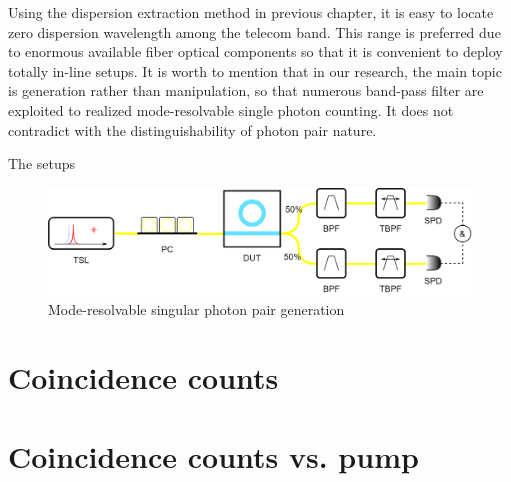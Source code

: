Using the dispersion extraction method in previous chapter, it is easy to locate zero dispersion wavelength among the telecom band. This range is preferred due to enormous available fiber optical components so that it is convenient to deploy totally in-line setups.
It is worth to mention that in our research, the main topic is generation rather than manipulation, so that numerous band-pass filter are exploited to realized mode-resolvable single photon counting. It does not contradict with the distinguishability of photon pair nature.

The setups 

\begin{figure}
	\centering
	\includegraphics[width=0.7\linewidth]{imgs/png/biBPF}
	\caption{Mode-resolvable singular photon pair generation}
	\label{fig:bibpf}
\end{figure}




\section{Coincidence counts}






\section{Coincidence counts vs. pump}

